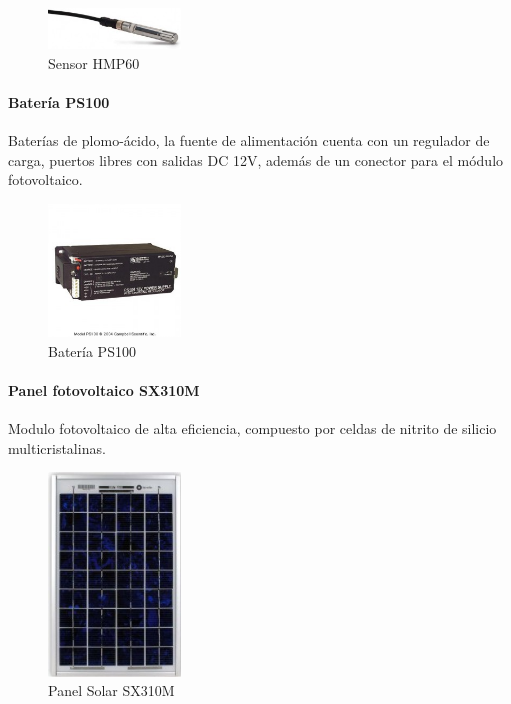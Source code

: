 \begin{figure}[h!]
        \centering
        \includegraphics[width=100pt]{images/SensorThmp60}
        \caption{Sensor HMP60}
	\label{hr}
\end{figure}

\paragraph{Batería PS100}
Baterías de plomo-ácido, la fuente de alimentación cuenta con un regulador de carga, puertos libres con salidas DC 12V, además de un conector para el módulo fotovoltaico.

\begin{figure}[h!]
        \centering
        \includegraphics[width=100pt]{images/bateria}
        \caption{Batería PS100} 
\end{figure}

\paragraph{Panel fotovoltaico SX310M}
Modulo fotovoltaico de alta eficiencia, compuesto por celdas de nitrito de silicio multicristalinas.

\begin{figure}[h!]
        \centering
        \includegraphics[width=100pt]{images/panelSolar}
        \caption{Panel Solar SX310M} 
\end{figure}

